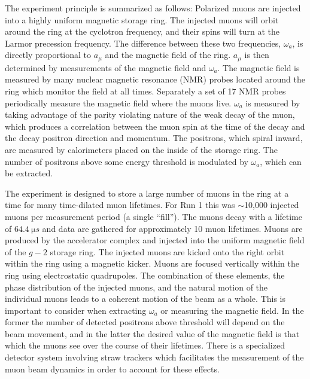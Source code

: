 \documentclass[12pt,letterpaper]{article}
\def\wa{$\omega_{a}$\xspace}
\def\gmtwo{$g-2$\xspace}
\def\amu{$a_{\mu}$\xspace}
\begin{document}
The experiment principle is summarized as follows: Polarized muons are injected into a highly uniform magnetic storage ring. The injected muons will orbit around the ring at the cyclotron frequency, and their spins will turn at the Larmor precession frequency. The difference between these two frequencies, \wa, is directly proportional to \amu and the magnetic field of the ring. \amu is then determined by measurements of the magnetic field and \wa. The magnetic field is measured by many nuclear magnetic resonance (NMR) probes located around the ring which monitor the field at all times. Separately a set of 17 NMR probes periodically measure the magnetic field where the muons live. \wa is measured by taking advantage of the parity violating nature of the weak decay of the muon, which produces a correlation between the muon spin at the time of the decay and the decay positron direction and momentum. The positrons, which spiral inward, are measured by calorimeters placed on the inside of the storage ring. The number of positrons above some energy threshold is modulated by \wa, which can be extracted.


The experiment is designed to store a large number of muons in the ring at a time for many time-dilated muon lifetimes. For Run 1 this was $\sim$10,000 injected muons per measurement period (a single ``fill''). The muons decay with a lifetime of $\SI{64.4}{\micro s}$ and data are gathered for approximately 10 muon lifetimes. Muons are produced by the accelerator complex and injected into the uniform magnetic field of the \gmtwo storage ring. The injected muons are kicked onto the right orbit within the ring using a magnetic kicker. Muons are focused vertically within the ring using electrostatic quadrupoles. The combination of these elements, the phase distribution of the injected muons, and the natural motion of the individual muons leads to a coherent motion of the beam as a whole. This is important to consider when extracting \wa or measuring the magnetic field. In the former the number of detected positrons above threshold will depend on the beam movement, and in the latter the desired value of the magnetic field is that which the muons see over the course of their lifetimes. There is a specialized detector system involving straw trackers which facilitates the measurement of the muon beam dynamics in order to account for these effects.
\end{document}
